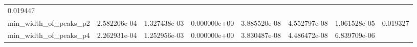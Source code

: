\documentclass[11pt]{article}
\begin{document}
\begin{longtable}[]{@{}llllllll@{}}
\begin{minipage}[t]{0.08\columnwidth}
0.019447\strut
\end{minipage}\tabularnewline
\begin{minipage}[t]{0.16\columnwidth}\raggedright
min\_width\_of\_peaks\_p2\strut
\end{minipage} & \begin{minipage}[t]{0.09\columnwidth}\raggedright
2.582206e-04\strut
\end{minipage} & \begin{minipage}[t]{0.09\columnwidth}\raggedright
1.327438e-03\strut
\end{minipage} & \begin{minipage}[t]{0.09\columnwidth}\raggedright
0.000000e+00\strut
\end{minipage} & \begin{minipage}[t]{0.09\columnwidth}\raggedright
3.885520e-08\strut
\end{minipage} & \begin{minipage}[t]{0.09\columnwidth}\raggedright
4.552797e-08\strut
\end{minipage} & \begin{minipage}[t]{0.09\columnwidth}\raggedright
1.061528e-05\strut
\end{minipage} & \begin{minipage}[t]{0.08\columnwidth}\raggedright
0.019327\strut
\end{minipage}\tabularnewline
\begin{minipage}[t]{0.16\columnwidth}\raggedright
min\_width\_of\_peaks\_p4\strut
\end{minipage} & \begin{minipage}[t]{0.09\columnwidth}\raggedright
2.262931e-04\strut
\end{minipage} & \begin{minipage}[t]{0.09\columnwidth}\raggedright
1.252956e-03\strut
\end{minipage} & \begin{minipage}[t]{0.09\columnwidth}\raggedright
0.000000e+00\strut
\end{minipage} & \begin{minipage}[t]{0.09\columnwidth}\raggedright
3.830487e-08\strut
\end{minipage} & \begin{minipage}[t]{0.09\columnwidth}\raggedright
4.486472e-08\strut
\end{minipage} & \begin{minipage}[t]{0.09\columnwidth}\raggedright
6.839709e-06\strut
\end{minipage} & \begin{minipage}[t]{0.08\columnwidth}\raggedright

\end{minipage}
\end{longtable}
\end{document}
